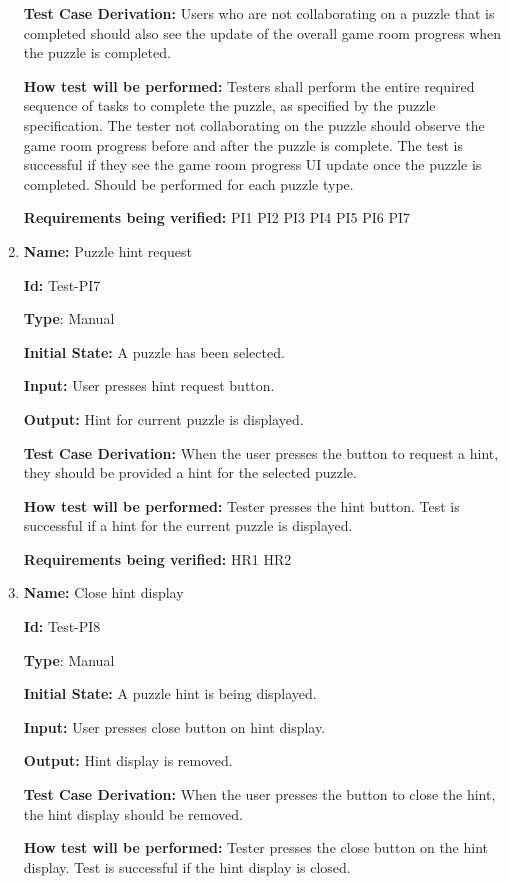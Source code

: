 \documentclass[12pt, titlepage]{article}
\begin{document}
\begin{enumerate}
\textbf{Test Case Derivation:}
Users who are not collaborating on a puzzle that is completed should also see the update of the overall game room progress when the puzzle is completed.

\textbf{How test will be performed:}
Testers shall perform the entire required sequence of tasks to complete the puzzle, as specified by the puzzle specification. The tester not collaborating on the puzzle should observe the game room progress before and after the puzzle is complete. The test is successful if they see the game room progress UI update once the puzzle is completed. Should be performed for each puzzle type.

\textbf{Requirements being verified: } PI1 PI2 PI3 PI4 PI5 PI6 PI7

\item{\textbf{Name:} Puzzle hint request} \label{itm:Test-PI8}

\textbf{Id:} Test-PI7

\textbf{Type}: Manual

\textbf{Initial State:} A puzzle has been selected.

\textbf{Input:} User presses hint request button.

\textbf{Output:} Hint for current puzzle is displayed.

\textbf{Test Case Derivation:}
When the user presses the button to request a hint, they should be provided a hint for the selected puzzle.

\textbf{How test will be performed:}
Tester presses the hint button. Test is successful if a hint for the current puzzle is displayed.

\textbf{Requirements being verified: } HR1 HR2

\item{\textbf{Name:} Close hint display} \label{itm:Test-PI9}

\textbf{Id:} Test-PI8

\textbf{Type}: Manual

\textbf{Initial State:} A puzzle hint is being displayed.

\textbf{Input:} User presses close button on hint display.

\textbf{Output:} Hint display is removed.

\textbf{Test Case Derivation:}
When the user presses the button to close the hint, the hint display should be removed.

\textbf{How test will be performed:}
Tester presses the close button on the hint display. Test is successful if the hint display is closed.


\end{enumerate}
\end{document}

